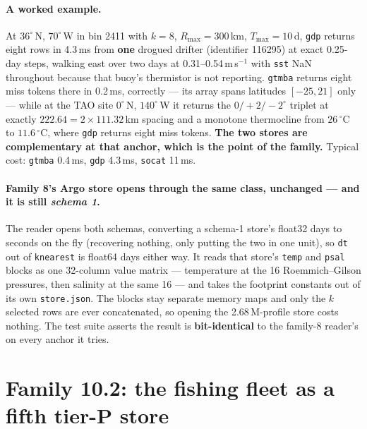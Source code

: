 \documentclass[10pt]{article}
\newcommand{\code}[1]{\texttt{#1}}
\begin{document}
\paragraph{A worked example.} At $36^\circ$\,N, $70^\circ$\,W in bin 2411
with $k = 8$, $R_{\max} = 300$\,km, $T_{\max} = 10$\,d, \code{gdp} returns
eight rows in 4.3\,ms from \textbf{one} drogued drifter (identifier 116295) at
exact 0.25-day steps, walking east over two days at 0.31--0.54\,m\,s$^{-1}$
with \code{sst} NaN throughout because that buoy's thermistor is not reporting.
\code{gtmba} returns eight miss tokens there in 0.2\,ms, correctly --- its array
spans latitudes $[-25, 21]$ only --- while at the TAO site $0^\circ$\,N,
$140^\circ$\,W it returns the $0/+2/-2^\circ$ triplet at exactly
$222.64 = 2 \times 111.32$\,km spacing and a monotone thermocline from
$26\,^\circ$C to $11.6\,^\circ$C, where \code{gdp} returns eight miss tokens.
\textbf{The two stores are complementary at that anchor, which is the point of
the family.} Typical cost: \code{gtmba} 0.4\,ms, \code{gdp} 4.3\,ms,
\code{socat} 11\,ms.

\paragraph{Family 8's Argo store opens through the same class, unchanged ---
and it is still \emph{schema 1}.} The reader opens both schemas, converting a
schema-1 store's float32 days to seconds on the fly (recovering nothing, only
putting the two in one unit), so \code{dt} out of \code{knearest} is float64
days either way. It reads that store's \code{temp} and \code{psal} blocks as one
32-column value matrix --- temperature at the 16 Roemmich--Gilson pressures, then salinity at
the same 16 --- and takes the footprint constants out of its own
\code{store.json}. The blocks stay separate memory maps and only the $k$
selected rows are ever concatenated, so opening the 2.68\,M-profile store costs
nothing. The test suite asserts the result is \textbf{bit-identical} to the
family-8 reader's on every anchor it tries.

\section{Family 10.2: the fishing fleet as a fifth tier-P store}
\end{document}
